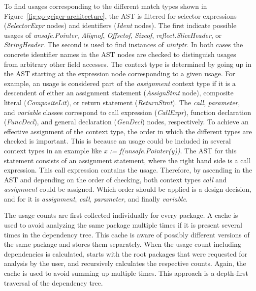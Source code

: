 To find \unsafe{} usages corresponding to the different match types shown in Figure~\ref{fig:go-geiger-architecture},
the \acrshort{AST} is filtered for selector expressions (\textit{SelectorExpr} nodes) and identifiers (\textit{Ident}
nodes).
The first indicate possible usages of \textit{unsafe.Pointer}, \textit{Alignof}, \textit{Offsetof}, \textit{Sizeof},
\textit{reflect.SliceHeader}, or \textit{StringHeader}.
The second is used to find instances of \textit{uintptr}.
In both cases the concrete identifier names in the \acrshort{AST} nodes are checked to distinguish \unsafe{} usages from
arbitrary other field accesses.
The context type is determined by going up in the \acrshort{AST} starting at the expression node corresponding to a
given \unsafe{} usage.
For example, an \unsafe{} usage is considered part of the \textit{assignment} context type if it is a descendent of
either an assignment statement (\textit{AssignStmt} node), composite literal (\textit{CompositeLit}), or return
statement (\textit{ReturnStmt}).
The \textit{call}, \textit{parameter}, and \textit{variable} classes correspond to call expression (\textit{CallExpr}),
function declaration (\textit{FuncDecl}), and general declaration (\textit{GenDecl}) nodes, respectively.
To achieve an effective assignment of the context type, the order in which the different types are checked is important.
This is because an \unsafe{} usage could be included in several context types in an example like
\textit{x := f(unsafe.Pointer(y))}.
The \acrshort{AST} for this statement consists of an assignment statement, where the right hand side is a call
expression.
This call expression contains the \unsafe{} usage.
Therefore, by ascending in the \acrshort{AST} and depending on the order of checking, both context types \textit{call}
and \textit{assignment} could be assigned.
Which order should be applied is a design decision, and for \toolGeiger{} it is \textit{assignment}, \textit{call},
\textit{parameter}, and finally \textit{variable}.

The \unsafe{} usage counts are first collected individually for every package.
A cache is used to avoid analyzing the same package multiple times if it is present several times in the dependency
tree.
This cache is aware of possibly different versions of the same package and stores them separately.
When the usage count including dependencies is calculated, \toolGeiger{} starts with the root packages that were
requested for analysis by the user, and recursively calculates the respective counts.
Again, the cache is used to avoid summing up multiple times.
This approach is a depth-first traversal of the dependency tree.


